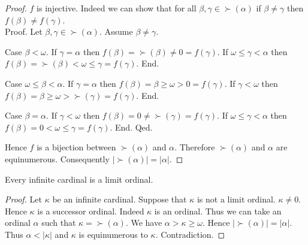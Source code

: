 \documentclass[10pt]{article}
\begin{document}
\begin{forthel}
\begin{proof}
      $f$ is injective.
      Indeed we can show that for all $\beta, \gamma \in \succ(\alpha)$ if
      $\beta \neq \gamma$ then $f(\beta) \neq f(\gamma)$. \\
      Proof.
        Let $\beta, \gamma \in \succ(\alpha)$.
        Assume $\beta \neq \gamma$.

        Case $\beta < \omega$.
          If $\gamma = \alpha$ then
          $f(\beta)
            = \succ(\beta)
            \neq 0
            = f(\gamma)$.
          If $\omega \leq \gamma < \alpha$ then
          $f(\beta)
            = \succ(\beta)
            < \omega
            \leq \gamma
            = f(\gamma)$.
        End.

        Case $\omega \leq \beta < \alpha$.
          If $\gamma = \alpha$ then
          $f(\beta)
            = \beta
            \geq \omega
            > 0
            = f(\gamma)$.
          If $\gamma < \omega$ then
          $f(\beta)
            = \beta
            \geq \omega
            > \succ(\gamma)
            = f(\gamma)$.
        End.

        Case $\beta = \alpha$.
          If $\gamma < \omega$ then
          $f(\beta)
            = 0
            \neq \succ(\gamma)
            = f(\gamma)$.
          If $\omega \leq \gamma < \alpha$ then
          $f(\beta)
            = 0
            < \omega
            \leq \gamma
            = f(\gamma)$.
        End.
      Qed.

      Hence $f$ is a bijection between $\succ(\alpha)$ and $\alpha$.
      Therefore $\succ(\alpha)$ and $\alpha$ are equinumerous.
      Consequently $|\succ(\alpha)| = |\alpha|$.
    \end{proof}
  \end{forthel}

  \begin{forthel}
    \begin{proposition}[id=SET_THEORY_07_8700732632989696,printid]
      Every infinite cardinal is a limit ordinal.
    \end{proposition}
    \begin{proof}
      Let $\kappa$ be an infinite cardinal.
      Suppose that $\kappa$ is not a limit ordinal.
      $\kappa \neq 0$.
      Hence $\kappa$ is a successor ordinal.
      Indeed $\kappa$ is an ordinal.
      Thus we can take an ordinal $\alpha$ such that $\kappa = \succ(\alpha)$.
      We have $\alpha > \kappa \geq \omega$.
      Hence $|\succ(\alpha)| = |\alpha|$.
      Thus $\alpha < |\kappa|$ and $\kappa$ is equinumerous to $\kappa$.
      Contradiction.
    \end{proof}
  \end{forthel}
\end{document}
